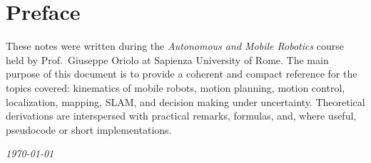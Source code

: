 \chapter*{Preface}
These notes were written during the \emph{Autonomous and Mobile Robotics}
course held by Prof.\ Giuseppe Oriolo at Sapienza University of Rome.
The main purpose of this document is to provide a coherent and compact
reference for the topics covered: kinematics of mobile robots, motion
planning, motion control, localization, mapping, SLAM, and decision
making under uncertainty. Theoretical derivations are interspersed with
practical remarks, formulas, and, where useful, pseudocode or short
implementations.

\emph{\today}
